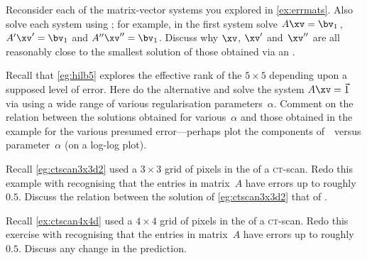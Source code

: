 \begin{exercise} \label{ex:} 
Reconsider each of the matrix-vector systems you explored in \autoref{ex:errmats}.
Also solve each system using ; for example, in the first system solve \(A\xv=\bv_1\)\,, \(A'\xv'=\bv_1\) and \(A''\xv''=\bv_1\).
Discuss why \(\xv\), \(\xv'\) and~\(\xv''\) are all reasonably close to the smallest solution of those obtained via an \svd.
\end{exercise}




\begin{exercise} \label{ex:} 
Recall that \autoref{eg:hilb5} explores the effective rank of the \(5\times5\)  depending upon a supposed level of error.
Here do the alternative and solve the system \(A\xv=\vec 1\) via  using a wide range of various regularisation parameters~\(\alpha\).
Comment on the relation between the solutions obtained for various~\(\alpha\) and those obtained in the example for the various presumed error---perhaps plot the components of~\xv\ versus parameter~\(\alpha\) (on a log-log plot).
\end{exercise}




\begin{exercise} \label{ex:} 
Recall \autoref{eg:ctscan3x3d2} used a \(3\times3\) grid of pixels in the  of a \textsc{ct}-scan.
Redo this example with  recognising that the entries in matrix~\(A\) have errors up to roughly~\(0.5\).
Discuss the relation between the solution of \autoref{eg:ctscan3x3d2} that of .
\end{exercise}




\begin{exercise} \label{ex:} 
Recall \autoref{ex:ctscan4x4d} used a \(4\times4\) grid of pixels in the  of a \textsc{ct}-scan.
Redo this exercise with  recognising that the entries in matrix~\(A\) have errors up to roughly~\(0.5\).
Discuss any change in the prediction.
\end{exercise}







